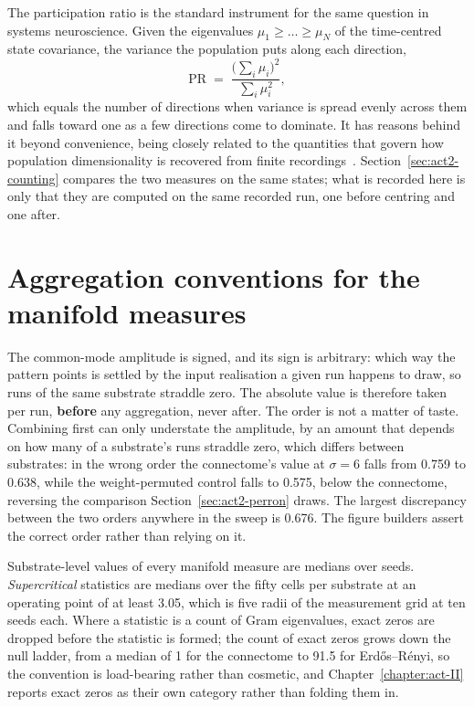 The participation ratio is the standard instrument for the same question in
systems neuroscience. Given the eigenvalues $\mu_1 \ge \dots \ge \mu_N$ of the
time-centred state covariance, the variance the population puts along each
direction,
\begin{equation}
    \mathrm{PR}
    \;=\; \frac{\bigl(\sum_i \mu_i\bigr)^{2}}{\sum_i \mu_i^{2}} ,
    \label{eq:pr}
\end{equation}
which equals the number of directions when variance is spread evenly across them
and falls toward one as a few directions come to dominate. It has reasons behind
it beyond convenience, being closely related to the quantities that govern how
population dimensionality is recovered from finite
recordings~\cite{gao2017theory}. Section~\ref{sec:act2-counting} compares the two
measures on the same states; what is recorded here is only that they are computed
on the same recorded run, one before centring and one after.


\section{Aggregation conventions for the manifold measures}
\label{sec:methods-aggregation}
\bigskip

The common-mode amplitude is signed, and its sign is arbitrary: which way the
pattern points is settled by the input realisation a given run happens to draw,
so runs of the same substrate straddle zero. The absolute value is therefore
taken per run, \textbf{before} any aggregation, never after. The order is not a
matter of taste. Combining first can only understate the amplitude, by an amount
that depends on how many of a substrate's runs straddle zero, which differs
between substrates: in the wrong order the connectome's value at $\sigma = 6$
falls from 0.759 %
to 0.638, %
while the weight-permuted control falls to
0.575, %
below the connectome, reversing the comparison
Section~\ref{sec:act2-perron} draws. The largest discrepancy between the two
orders anywhere in the sweep is
0.676. %
The figure builders assert the correct order rather than relying on it.

Substrate-level values of every manifold measure are medians over seeds.
\emph{Supercritical} statistics are medians over the fifty cells per substrate at
an operating point of at least
3.05, %
which is five radii of the measurement grid at ten seeds each. Where a statistic
is a count of Gram eigenvalues, exact zeros are dropped before the statistic is
formed; %
the count of exact zeros grows down the null ladder, from a median of
1 for the connectome to 91.5 for Erdős–Rényi, %
so the convention is load-bearing rather than cosmetic, and
Chapter~\ref{chapter:act-II} reports exact zeros as their own category rather
than folding them in.

